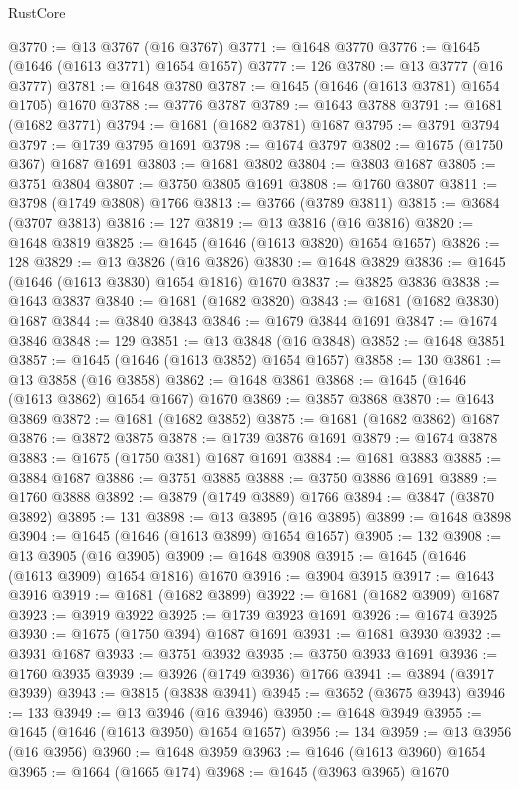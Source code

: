 \begin{lexlean}{RustCore}
\begin{coremodule}
@3770 := @13 @3767 (@16 @3767)
@3771 := @1648 @3770
@3776 := @1645 (@1646 (@1613 @3771) @1654 @1657)
@3777 := 126
@3780 := @13 @3777 (@16 @3777)
@3781 := @1648 @3780
@3787 := @1645 (@1646 (@1613 @3781) @1654 @1705) @1670
@3788 := @3776 @3787
@3789 := @1643 @3788
@3791 := @1681 (@1682 @3771)
@3794 := @1681 (@1682 @3781) @1687
@3795 := @3791 @3794
@3797 := @1739 @3795 @1691
@3798 := @1674 @3797
@3802 := @1675 (@1750 @367) @1687 @1691
@3803 := @1681 @3802
@3804 := @3803 @1687
@3805 := @3751 @3804
@3807 := @3750 @3805 @1691
@3808 := @1760 @3807
@3811 := @3798 (@1749 @3808) @1766
@3813 := @3766 (@3789 @3811)
@3815 := @3684 (@3707 @3813)
@3816 := 127
@3819 := @13 @3816 (@16 @3816)
@3820 := @1648 @3819
@3825 := @1645 (@1646 (@1613 @3820) @1654 @1657)
@3826 := 128
@3829 := @13 @3826 (@16 @3826)
@3830 := @1648 @3829
@3836 := @1645 (@1646 (@1613 @3830) @1654 @1816) @1670
@3837 := @3825 @3836
@3838 := @1643 @3837
@3840 := @1681 (@1682 @3820)
@3843 := @1681 (@1682 @3830) @1687
@3844 := @3840 @3843
@3846 := @1679 @3844 @1691
@3847 := @1674 @3846
@3848 := 129
@3851 := @13 @3848 (@16 @3848)
@3852 := @1648 @3851
@3857 := @1645 (@1646 (@1613 @3852) @1654 @1657)
@3858 := 130
@3861 := @13 @3858 (@16 @3858)
@3862 := @1648 @3861
@3868 := @1645 (@1646 (@1613 @3862) @1654 @1667) @1670
@3869 := @3857 @3868
@3870 := @1643 @3869
@3872 := @1681 (@1682 @3852)
@3875 := @1681 (@1682 @3862) @1687
@3876 := @3872 @3875
@3878 := @1739 @3876 @1691
@3879 := @1674 @3878
@3883 := @1675 (@1750 @381) @1687 @1691
@3884 := @1681 @3883
@3885 := @3884 @1687
@3886 := @3751 @3885
@3888 := @3750 @3886 @1691
@3889 := @1760 @3888
@3892 := @3879 (@1749 @3889) @1766
@3894 := @3847 (@3870 @3892)
@3895 := 131
@3898 := @13 @3895 (@16 @3895)
@3899 := @1648 @3898
@3904 := @1645 (@1646 (@1613 @3899) @1654 @1657)
@3905 := 132
@3908 := @13 @3905 (@16 @3905)
@3909 := @1648 @3908
@3915 := @1645 (@1646 (@1613 @3909) @1654 @1816) @1670
@3916 := @3904 @3915
@3917 := @1643 @3916
@3919 := @1681 (@1682 @3899)
@3922 := @1681 (@1682 @3909) @1687
@3923 := @3919 @3922
@3925 := @1739 @3923 @1691
@3926 := @1674 @3925
@3930 := @1675 (@1750 @394) @1687 @1691
@3931 := @1681 @3930
@3932 := @3931 @1687
@3933 := @3751 @3932
@3935 := @3750 @3933 @1691
@3936 := @1760 @3935
@3939 := @3926 (@1749 @3936) @1766
@3941 := @3894 (@3917 @3939)
@3943 := @3815 (@3838 @3941)
@3945 := @3652 (@3675 @3943)
@3946 := 133
@3949 := @13 @3946 (@16 @3946)
@3950 := @1648 @3949
@3955 := @1645 (@1646 (@1613 @3950) @1654 @1657)
@3956 := 134
@3959 := @13 @3956 (@16 @3956)
@3960 := @1648 @3959
@3963 := @1646 (@1613 @3960) @1654
@3965 := @1664 (@1665 @174)
@3968 := @1645 (@3963 @3965) @1670

\end{coremodule}
\end{lexlean}
